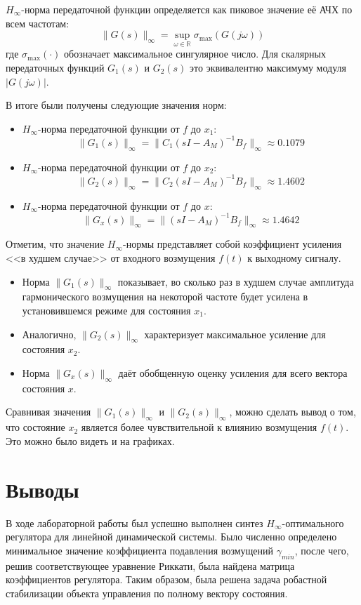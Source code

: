 \documentclass[a4paper,hidelinks,14pt]{extarticle}
\begin{document}
	$H_\infty$-норма передаточной функции определяется как пиковое значение её АЧХ по всем частотам:
	\[
		\| G(s) \|_{\infty} = \sup_{\omega \in \mathbb{R}} \sigma_{\max}(G(j\omega))
	\]
	где $\sigma_{\max}(\cdot)$ обозначает максимальное сингулярное число. Для скалярных передаточных функций $G_1(s)$ и $G_2(s)$ это эквивалентно максимуму модуля $|G(j\omega)|$.

	В итоге были получены следующие значения норм:
	\begin{itemize}
		\item $H_\infty$-норма передаточной функции от $f$ до $x_1$:
		\[
			\| G_1(s) \|_{\infty} = \| C_1(sI - A_M)^{-1}B_f \|_{\infty} \approx 0.1079
		\]
		\item $H_\infty$-норма передаточной функции от $f$ до $x_2$:
		\[
			\| G_2(s) \|_{\infty} = \| C_2(sI - A_M)^{-1}B_f \|_{\infty} \approx 1.4602
		\]
		\item $H_\infty$-норма передаточной функции от $f$ до $x$:
		\[
			\| G_x(s) \|_{\infty} = \| (sI - A_M)^{-1}B_f \|_{\infty} \approx 1.4642
		\]
	\end{itemize}

	Отметим, что значение $H_\infty$-нормы представляет собой коэффициент усиления <<в худшем случае>> от входного возмущения $f(t)$ к выходному сигналу.
	\begin{itemize}
		\item Норма $\| G_1(s) \|_{\infty}$ показывает, во сколько раз в худшем случае амплитуда гармонического возмущения на некоторой частоте будет усилена в установившемся режиме для состояния $x_1$.
		\item Аналогично, $\| G_2(s) \|_{\infty}$ характеризует максимальное усиление для состояния $x_2$.
		\item Норма $\| G_x(s) \|_{\infty}$ даёт обобщенную оценку усиления для всего вектора состояния $x$.
	\end{itemize}

	Сравнивая значения $\| G_1(s) \|_{\infty}$ и $\| G_2(s) \|_{\infty}$, можно сделать вывод о том, что состояние $x_2$ является более чувствительной к влиянию возмущения $f(t)$. Это можно было видеть и на графиках.

	\section{Выводы}
	В ходе лабораторной работы был успешно выполнен синтез $H_\infty$-оптимального регулятора для линейной динамической системы. Было численно определено минимальное значение коэффициента подавления возмущений $\gamma_{min}$, после чего, решив соответствующее уравнение Риккати, была найдена матрица коэффициентов регулятора. Таким образом, была решена задача робастной стабилизации объекта управления по полному вектору состояния.

	
\end{document}
